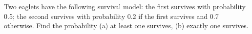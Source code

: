 Two eaglets have the following survival model: the first survives with probability 0.5; the second survives with probability 0.2 if the first survives and 0.7 otherwise. Find the probability (a) at least one survives, (b) exactly one survives.
